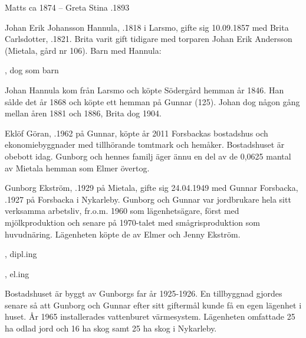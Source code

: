 Matts \textdied ca 1874  --  Greta Stina .1893


Johan Erik Johansson Hannula, .1818 i Larsmo, gifte sig 10.09.1857 med Brita Carlsdotter, .1821. Brita varit gift tidigare med torparen Johan Erik Andersson (Mietala, gård nr 106). Barn med Hannula:
\begin{jhchildren}
  \item {}
  \item {}
  \item {}, dog som barn
  \item {}
\end{jhchildren}
Johan Hannula kom från Larsmo och köpte Södergård hemman år 1846. Han sålde det år 1868 och köpte ett hemman på Gunnar (125). Johan dog någon gång mellan åren 1881 och 1886, Brita dog 1904.




Eklöf Göran, .1962 på Gunnar, köpte år 2011 Forsbackas bostadshus och ekonomiebyggnader med tillhörande tomtmark och hemåker. Bostadshuset är obebott idag. Gunborg och hennes familj äger ännu en del av de 0,0625 mantal av Mietala hemman som Elmer övertog.

Gunborg Ekström, .1929 på Mietala, gifte sig 24.04.1949 med Gunnar Forsbacka, .1927 på Forsbacka i Nykarleby. Gunborg och Gunnar var jordbrukare hela sitt verksamma arbetsliv, fr.o.m. 1960 som lägenhetsägare, först med mjölkproduktion och senare på 1970-talet med smågrisproduktion som huvudnäring. Lägenheten köpte de av Elmer och Jenny Ekström.
\begin{jhchildren}
  \item {}, dipl.ing
  \item {}, el.ing
\end{jhchildren}
Bostadshuset är byggt av Gunborgs far år 1925-1926. En tillbyggnad gjordes senare så att Gunborg och Gunnar efter sitt
giftermål kunde få en egen lägenhet i huset. År 1965 installerades vattenburet värmesystem. Lägenheten omfattade 25 ha odlad jord och 16 ha skog samt 25 ha skog i Nykarleby.

